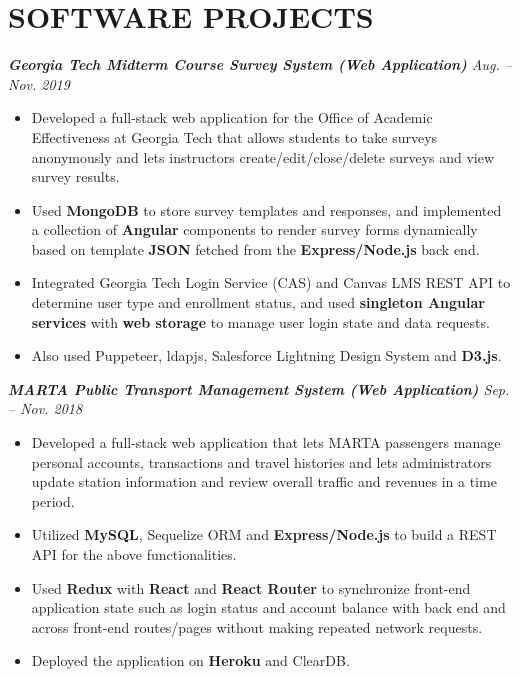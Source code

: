\documentclass[10pt]{article}
\begin{document}
\section*{SOFTWARE PROJECTS}
{\itshape {\bfseries Georgia Tech Midterm Course Survey System (Web Application)}  \hfill Aug. -- Nov. 2019}
\begin{itemize}[leftmargin=15pt, noitemsep, topsep=0pt]
\item Developed a full-stack web application for the Office of Academic Effectiveness at Georgia Tech that allows students to take surveys anonymously and lets instructors create/edit/close/delete surveys and view survey results.
\item Used \textbf{MongoDB} to store survey templates and responses, and implemented a collection of \textbf{Angular} components to render survey forms dynamically based on template \textbf{JSON} fetched from the \textbf{Express/Node.js} back end.
\item Integrated Georgia Tech Login Service (CAS) and Canvas LMS REST API to determine user type and enrollment status, and used \textbf{singleton Angular services} with \textbf{web storage} to manage user login state and data requests.
\item Also used Puppeteer, ldapjs, Salesforce Lightning Design System and \textbf{D3.js}.
\end{itemize}
\vspace{0.5em}
%
{\itshape {\bfseries MARTA Public Transport Management System (Web Application)} \hfill Sep. -- Nov. 2018}
\begin{itemize}[leftmargin=15pt, noitemsep, topsep=0pt]
\item Developed a full-stack web application that lets MARTA passengers manage personal accounts, transactions and travel histories and lets administrators update station information and review overall traffic and revenues in a time period.
\item Utilized \textbf{MySQL}, Sequelize ORM and \textbf{Express/Node.js} to build a REST API for the above functionalities.
\item Used \textbf{Redux} with \textbf{React} and \textbf{React Router} to synchronize front-end application state such as login status and account balance with back end and across front-end routes/pages without making repeated network requests. 
\item Deployed the application on \textbf{Heroku} and ClearDB.
\end{itemize}
\vspace{0.5em}
\end{document}
